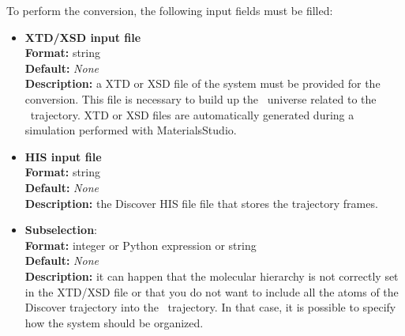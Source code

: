 \documentclass[a4paper,11pt]{report}
\begin{document}
To perform the conversion, the following input fields must be filled:
\hypertarget{discover_converter_xtd_xsd_input_file}{}
\begin{itemize}
\item \textbf{XTD/XSD input file}\\
\textbf{Format:} string\\
\textbf{Default:} \textit{None}\\
\textbf{Description:} a XTD or XSD file of the system must be provided for the conversion. This file is necessary to build up 
the \MMTK\ universe related to the \MMTK\ trajectory. XTD or XSD files are automatically generated during a simulation performed 
with MaterialsStudio.

\hypertarget{discover_converter_his_input_file}{}
\item \textbf{HIS input file}\\
\textbf{Format:} string\\
\textbf{Default:} \textit{None}\\
\textbf{Description:} the Discover HIS file file that stores the trajectory frames.

\hypertarget{discover_converter_subselection}{}
\item \textbf{Subselection}:\\
\textbf{Format:} integer or Python expression or string\\
\textbf{Default:} \textit{None}\\
\textbf{Description:} it can happen that the molecular hierarchy is not correctly set in the XTD/XSD file or that 
you do not want to include all the atoms of the Discover trajectory into the \MMTK\ trajectory. In that case, 
it is possible to specify how the system should be organized.


\end{itemize}
\end{document}
